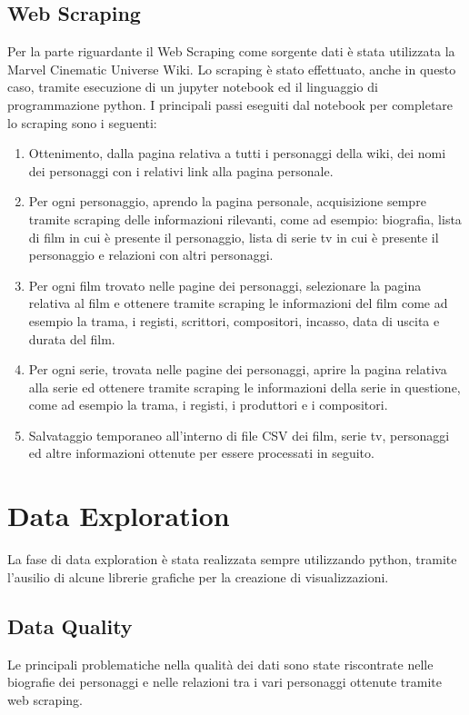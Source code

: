 \documentclass[
12pt, %
a4paper, %
oneside, %
headinclude,footinclude, %
BCOR5mm, %
]{scrartcl}
\begin{document}
\subsection{Web Scraping}
Per la parte riguardante il Web Scraping come sorgente dati è stata utilizzata la Marvel Cinematic Universe Wiki. \cite{linkFandom}
Lo scraping è stato effettuato, anche in questo caso, tramite esecuzione di un jupyter notebook ed il linguaggio di programmazione python.
I principali passi eseguiti dal notebook per completare lo scraping sono i seguenti:
\begin{enumerate}
\item Ottenimento, dalla pagina relativa a tutti i personaggi della wiki, dei nomi dei personaggi con i relativi link alla pagina personale. 
\item Per ogni personaggio, aprendo la pagina personale, acquisizione sempre tramite scraping delle informazioni rilevanti, come ad esempio: biografia, lista di film in cui è presente il personaggio, lista di serie tv in cui è presente il personaggio e relazioni con altri personaggi.
\item Per ogni film trovato nelle pagine dei personaggi, selezionare la pagina relativa al film e ottenere tramite scraping le informazioni del film come ad esempio la trama, i registi, scrittori, compositori, incasso, data di uscita e durata del film.
\item Per ogni serie, trovata nelle pagine dei personaggi, aprire la pagina relativa alla serie ed ottenere tramite scraping le informazioni della serie in questione, come ad esempio la trama, i registi, i produttori e i compositori.
\item Salvataggio temporaneo all'interno di file CSV dei film, serie tv, personaggi ed altre informazioni ottenute per essere processati in seguito.
\end{enumerate}

\section{Data Exploration}
La fase di data exploration è stata realizzata sempre utilizzando python, tramite l'ausilio di alcune librerie grafiche per la creazione di visualizzazioni.

\subsection{Data Quality}
Le principali problematiche nella qualità dei dati sono state riscontrate nelle biografie dei personaggi e nelle relazioni tra i vari personaggi ottenute tramite web scraping.
\end{document}
